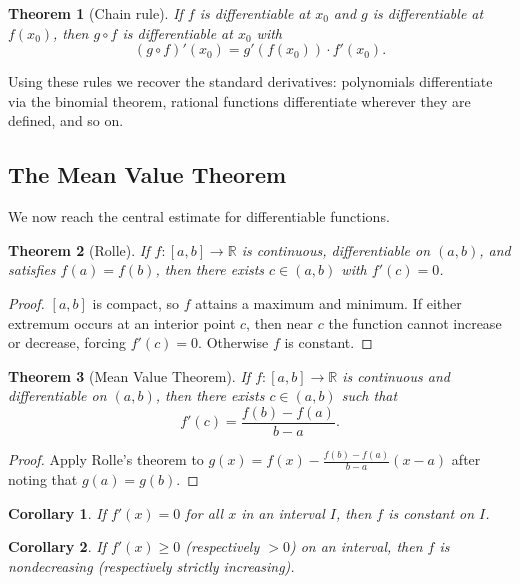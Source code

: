 \documentclass{article}
\theoremstyle{definition}
\theoremstyle{plain}
\newtheorem{theorem}{Theorem}[section]
\newtheorem{corollary}{Corollary}[theorem]
\begin{document}
\begin{theorem}[Chain rule]\label{thm:chain}
	If $f$ is differentiable at $x_0$ and $g$ is differentiable at $f(x_0)$, then $g\circ f$ is differentiable at $x_0$ with
	\[
		(g\circ f)'(x_0) = g'(f(x_0))\cdot f'(x_0).
	\]
\end{theorem}

Using these rules we recover the standard derivatives: polynomials differentiate via the binomial theorem, rational functions differentiate wherever they are defined, and so on.

\subsection{The Mean Value Theorem}\label{subsec:mvt}
We now reach the central estimate for differentiable functions.

\begin{theorem}[Rolle]\label{thm:rolle}
	If $f\colon [a,b]\to \mathbb{R}$ is continuous, differentiable on $(a,b)$, and satisfies $f(a)=f(b)$, then there exists $c\in (a,b)$ with $f'(c)=0$.
\end{theorem}
\begin{proof}
	$[a,b]$ is compact, so $f$ attains a maximum and minimum. If either extremum occurs at an interior point $c$, then near $c$ the function cannot increase or decrease, forcing $f'(c)=0$. Otherwise $f$ is constant.
\end{proof}

\begin{theorem}[Mean Value Theorem]\label{thm:mvt}
	If $f\colon [a,b]\to \mathbb{R}$ is continuous and differentiable on $(a,b)$, then there exists $c\in (a,b)$ such that
	\[
		f'(c) = \frac{f(b)-f(a)}{b-a}.
	\]
\end{theorem}
\begin{proof}
	Apply Rolle's theorem to $g(x)=f(x) - \frac{f(b)-f(a)}{b-a}(x-a)$ after noting that $g(a)=g(b)$.
\end{proof}

\begin{corollary}\label{cor:zero-derivative}
	If $f'(x)=0$ for all $x$ in an interval $I$, then $f$ is constant on $I$.
\end{corollary}

\begin{corollary}\label{cor:derivative-sign}
	If $f'(x)\ge 0$ (respectively $>0$) on an interval, then $f$ is nondecreasing (respectively strictly increasing).
\end{corollary}
\end{document}
